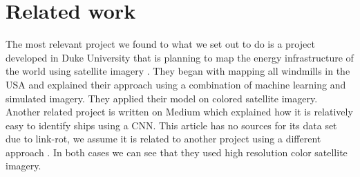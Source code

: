 \section{Related work}
%

The most relevant project we found to what we set out to do is a project developed in Duke University that is planning to map the energy infrastructure of the world using satellite imagery \cite{duke}. They began with mapping all windmills in the USA and explained their approach \cite{duke_github} using a combination of machine learning and simulated imagery. They applied their model on colored satellite imagery.\\

Another related project is written on Medium \cite{moraite_2019} which explained how it is relatively easy to identify ships using a CNN. This article has no sources for its data set due to link-rot, we assume it is related to another project using a different approach \cite{sagar_2019}. In both cases we can see that they used high resolution color satellite imagery.\\
